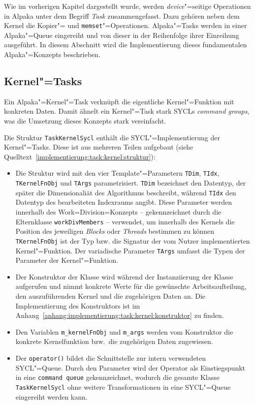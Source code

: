 Wie im vorherigen Kapitel dargestellt wurde, werden \textit{device}"=seitige
Operationen in Alpaka unter dem Begriff \textit{Task} zusammengefasst. Dazu
gehören neben dem Kernel die Kopier"= und \texttt{memset}"=Operationen.
Alpaka"=Tasks werden in einer Alpaka"=Queue eingereiht und von dieser in der
Reihenfolge ihrer Einreihung ausgeführt. In diesem Abschnitt wird die
Implementierung dieses fundamentalen Alpaka"=Konzepts beschrieben.

\subsection{Kernel"=Tasks}
\label{implementierung:task:kernel}

Ein Alpaka"=Kernel"=Task verknüpft die eigentliche Kernel"=Funktion mit
konkreten Daten. Damit ähnelt ein Kernel"=Task stark SYCLs
\textit{command groups}, was die Umsetzung dieses Konzepts stark vereinfacht.

Die Struktur \texttt{TaskKernelSycl} enthält die SYCL"=Implementierung der
Kernel"=Tasks. Diese ist aus mehreren Teilen aufgebaut (siehe
Quelltext~\ref{implementierung:task:kernel:struktur}):

\begin{itemize}
    \item Die Struktur wird mit den vier Template"=Parametern \texttt{TDim},
          \texttt{TIdx}, \texttt{TKernelFnObj} und \texttt{TArgs}
          parametrisiert. \texttt{TDim} bezeichnet den Datentyp, der später die
          Dimensionaliät des Algorithmus beschreibt, während \texttt{TIdx} den
          Datentyp des bearbeiteten Indexraums angibt. Diese Parameter werden
          innerhalb des Work=Division=Konzepts -- gekennzeichnet durch die
          Elternklasse \texttt{workDivMembers} -- verwendet, um innerhalb des
          Kernels die Position des jeweiligen \textit{Blocks} oder
          \textit{Threads} bestimmen zu können \texttt{TKernelFnObj} ist der Typ
          bzw. die Signatur der vom Nutzer implementierten Kernel"=Funktion. Der
          variadische Parameter \texttt{TArgs} umfasst die Typen der Parameter
          der Kernel"=Funktion.
    \item Der Konstruktor der Klasse wird während der Instanziierung der Klasse
          aufgerufen und nimmt konkrete Werte für die gewünschte
          Arbeitsaufteilung, den auszuführenden Kernel und die zugehörigen Daten
          an. Die Implementierung des Konstruktors ist im
          Anhang~\ref{anhang:implementierung:task:kernel:konstruktor} zu finden.
    \item Den Variablen \texttt{m\_kernelFnObj} und \texttt{m\_args} werden vom
          Konstruktor die konkrete Kernelfunktion bzw.\ die zugehörigen Daten
          zugewiesen.
    \item Der \texttt{operator()} bildet die Schnittstelle zur intern
          verwendeten SYCL"=Queue. Durch den Parameter wird der Operator als
          Einstiegspunkt in eine \texttt{command queue} gekennzeichnet, wodurch
          die gesamte Klasse \texttt{TaskKernelSycl} ohne weitere
          Transformationen in eine SYCL"=Queue eingereiht werden kann.
\end{itemize}

